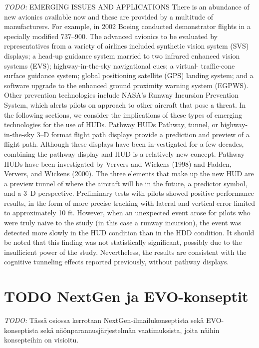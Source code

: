\documentclass[utf8,bachelor,manualbib]{gradu3}
\begin{document}
\emph{TODO:}
EMERGING ISSUES AND APPLICATIONS
There is an abundance of new avionics available now and these are provided by
a multitude of manufacturers. For example, in 2002 Boeing conducted demonstrator
flights in a specially modified 737–900. The advanced avionics to be
evaluated by representatives from a variety of airlines included synthetic vision
system (SVS) displays; a head-up guidance system married to two infrared enhanced
vision systems (EVS); highway-in-the-sky navigational cues; a virtual-
traffic-cone surface guidance system; global positioning satellite (GPS)
landing system; and a software upgrade to the enhanced ground proximity warning
system (EGPWS). Other prevention technologies include NASA’s Runway
Incursion Prevention System, which alerts pilots on approach to other aircraft
that pose a threat. In the following sections, we consider the implications of
these types of emerging technologies for the use of HUDs.
Pathway HUDs
Pathway, tunnel, or highway-in-the-sky 3–D format flight path displays provide
a prediction and preview of a flight path. Although these displays have been in-vestigated for a few decades, combining the pathway display and HUD is a relatively
new concept.
Pathway HUDs have been investigated by Ververs and Wickens (1998) and
Fadden, Ververs, and Wickens (2000). The three elements that make up the new
HUD are a preview tunnel of where the aircraft will be in the future, a predictor
symbol, and a 3–D perspective. Preliminary tests with pilots showed positive performance
results, in the form of more precise tracking with lateral and vertical error
limited to approximately 10 ft. However, when an unexpected event arose for
pilots who were truly naive to the study (in this case a runway incursion), the event
was detected more slowly in the HUD condition than in the HDD condition. It
should be noted that this finding was not statistically significant, possibly due to
the insufficient power of the study. Nevertheless, the results are consistent with the
cognitive tunneling effects reported previously, without pathway displays. \citep{crawfordneal2006}



\section{TODO NextGen ja EVO-konseptit}

\emph{TODO:}
Tässä osiossa kerrotaan NextGen-ilmailukonseptista sekä EVO-konseptista sekä näönparannusjärjestelmän vaatimuksista, joita näihin konsepteihin on visioitu.
\end{document}
